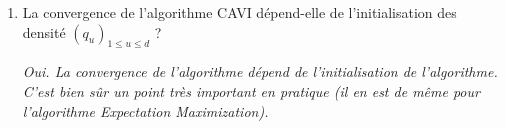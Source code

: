 \documentclass[a4paper,10pt,fleqn]{article}
\newcommand{\1}{\ensuremath{\mathbbm{1}}}
\begin{document}
\begin{enumerate}
\vspace{.2cm}

{\em
Il suffit d'\'ecrire, pour $1\leq j\leq d$, la fonction $z_j \mapsto \exp\{\mathbb{E}_{-j}[\log p (z_{j},Z_{-j},X)]\}$ en utilisant la forme exponentielle de l'\'enonc\'e et de supprimer les termes multiplicatifs ne d\'ependants pas de $z_j$.
}
\item La convergence de l'algorithme CAVI  d\'epend-elle de l'initialisation des densit\'e $(q_u)_{1\leqslant u\leqslant d}$ ?

\vspace{.2cm}

{\em
Oui. La convergence de l'algorithme d\'epend de l'initialisation de l'algorithme. C'est bien s\^ur un point tr\`es important en pratique (il en est de m\^eme pour l'algorithme Expectation Maximization).
}
\end{enumerate}
\end{document}
